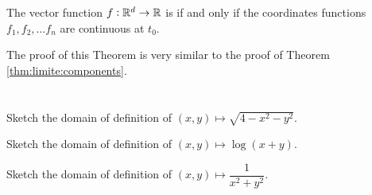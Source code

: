 \begin{thm} The vector function $f:\mathbb{R}^d \to \mathbb{R}$ is  if and only if the coordinates functions $f_1,f_2,\dots f_n$ are continuous at $t_0.$
\end{thm}

The proof of this Theorem is very similar to the proof of Theorem 
\ref{thm:limite:components}.


 

\section*{}
\begin{multicols}{2}\columnseprule 1pt \columnsep 25pt
\begin{problem}
Sketch the domain of definition of $(x,y)\mapsto \sqrt{4-x^2-y^2}$.
\end{problem}
\begin{problem}
Sketch the domain of definition of $(x,y)\mapsto \log (x+y)$.
\end{problem}
\begin{problem}
Sketch the domain of definition of $(x,y)\mapsto
\dfrac{1}{x^2+y^2}$.
\end{problem}


\end{multicols}
